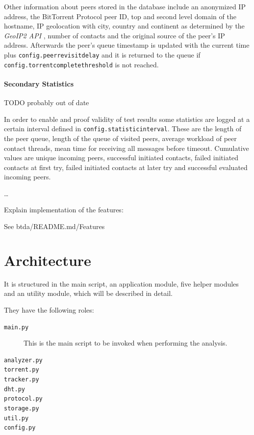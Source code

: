 \documentclass[10pt, a4paper, twoside, headsepline]{scrbook}
\renewcommand{\_}{\origunderscore\allowbreak}
\newcommand{\config}[1]{\texttt{config.\allowbreak #1}}
\begin{document}
Other information about peers stored in the database include an anonymized IP address, the BitTorrent Protocol peer ID, top and second level domain of the hostname, IP geolocation with city, country and continent as determined by the \emph{GeoIP2 API} \cite{geoip2-api}, number of contacts and the original source of the peer's IP address. Afterwards the peer's queue timestamp is updated with the current time plus \config{peer\_revisit\_delay} and it is returned to the queue if \config{torrent\_complete\_threshold} is not reached.

\paragraph{Secondary Statistics}
TODO probably out of date

In order to enable and proof validity of test results some statistics are logged at a certain interval defined in \config{statistic\_interval}. These are the length of the peer queue, length of the queue of visited peers, average workload of peer contact threads, mean time for receiving all messages before timeout. Cumulative values are unique incoming peers, successful initiated contacts, failed initiated contacts at first try, failed initiated contacts at later try and successful evaluated incoming peers.

\dots

\noindent\hrulefill

Explain implementation of the features:

See btda/README.md/Features

\section{Architecture}
It is structured in the main script, an application module, five helper modules and an utility module, which will be described in detail.

They have the following roles:

\begin{description}
  \item[\texttt{main.py}] This is the main script to be invoked when performing the analysis.
  \item[\texttt{analyzer.py}]
  \item[\texttt{torrent.py}]
  \item[\texttt{tracker.py}]
  \item[\texttt{dht.py}]
  \item[\texttt{protocol.py}]
  \item[\texttt{storage.py}]
  \item[\texttt{util.py}]
  \item[\texttt{config.py}]
\end{description}
\end{document}
